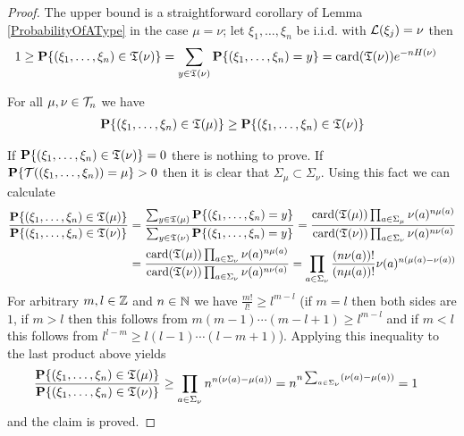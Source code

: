 \begin{proof}
The upper bound is a straightforward corollary of Lemma \ref{ProbabilityOfAType} in the case $\mu=\nu$; let $\xi_1, \dotsc, \xi_n$ be i.i.d. with
$\mathcal{L}(\xi_j) = \nu$ then
\begin{align*}
1 &\geq \textbf{P}\{(\xi_1, \dotsc, \xi_n) \in \mathfrak{T}(\nu)\} = \sum_{y \in \mathfrak{T}(\nu)} \textbf{P}\{(\xi_1, \dotsc, \xi_n) = y\} = 
\operatorname*{card}(\mathfrak{T}(\nu)) e^{-n H(\nu)}
\end{align*}

\begin{clm}For all $\mu, \nu \in \mathcal{T}_{n}$ we have 
\begin{align*}
\textbf{P}\{(\xi_1, \dotsc, \xi_n) \in \mathfrak{T}(\mu)\} \geq \textbf{P}\{(\xi_1, \dotsc, \xi_n) \in \mathfrak{T}(\nu)\}
\end{align*}
\end{clm}
If $\textbf{P}\{(\xi_1, \dotsc, \xi_n) \in \mathfrak{T}(\nu)\}=0$ there is nothing to prove. If $\textbf{P}\{\mathcal{T}((\xi_1, \dotsc, \xi_n)) = \mu\}>0$ then it is clear that $\Sigma_\mu \subset \Sigma_\nu$.  Using this fact we can calculate
\begin{align*}
\frac{\textbf{P}\{(\xi_1, \dotsc, \xi_n) \in \mathfrak{T}(\mu)\}}{\textbf{P}\{(\xi_1, \dotsc, \xi_n) \in \mathfrak{T}(\nu)\}} 
&=\frac{\sum_{y \in \mathfrak{T}(\mu)} \textbf{P}\{(\xi_1, \dotsc, \xi_n) = y\}}{\sum_{y \in \mathfrak{T}(\nu)} \textbf{P}\{(\xi_1, \dotsc, \xi_n) = y\}} =\frac{\operatorname*{card}(\mathfrak{T}(\mu)) \prod_{a \in \Sigma_{\mu}} \nu(a)^{n \mu(a)}}{\operatorname*{card}(\mathfrak{T}(\nu)) \prod_{a \in \Sigma_{\nu}} \nu(a)^{n \nu(a)}} \\
&=\frac{\operatorname*{card}(\mathfrak{T}(\mu)) \prod_{a \in \Sigma_{\nu}} \nu(a)^{n \mu(a)}}{\operatorname*{card}(\mathfrak{T}(\nu)) \prod_{a \in \Sigma_{\nu}} \nu(a)^{n \nu(a)}} 
=\prod_{a \in \Sigma_{\nu}}  \frac{(n \nu(a))! }{(n \mu(a))!} \nu(a)^{n (\mu(a) - \nu(a))}\\
\end{align*}
For arbitrary $m,l \in \mathbb{Z}$ and $n \in \mathbb{N}$ we have $\frac{m!}{l!} \geq l^{m-l}$ (if $m =l$ then both sides are $1$, if $m>l$ then this follows from $m(m-1) \dotsb (m-l+1) \geq l^{m-l}$ and if $m < l$ this follows from $l^{l-m} \geq l(l-1) \dotsb (l-m+1)$).  Applying this inequality to the last product above 
yields
\begin{align*}
\frac{\textbf{P}\{(\xi_1, \dotsc, \xi_n) \in \mathfrak{T}(\mu)\}}{\textbf{P}\{(\xi_1, \dotsc, \xi_n) \in \mathfrak{T}(\nu)\}} 
&\geq \prod_{a \in \Sigma_{\nu}}  n^{n (\nu(a) - \mu(a))} = n^{n \sum_{a \in \Sigma_{\nu}} (\nu(a) - \mu(a))} = 1
\end{align*}
and the claim is proved.


\end{proof}

